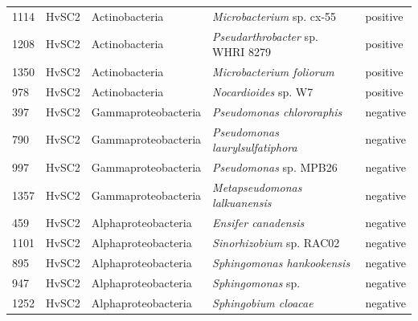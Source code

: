 \begin{longtable}{lllll}
		1114 & HvSC2 & Actinobacteria & \textit{Microbacterium} sp. cx-55 & positive \\
		1208 & HvSC2 & Actinobacteria & \textit{Pseudarthrobacter} sp. WHRI 8279 & positive \\
		1350 & HvSC2 & Actinobacteria & \textit{Microbacterium foliorum} & positive \\
		978 & HvSC2 & Actinobacteria & \textit{Nocardioides} sp. W7 & positive \\
		397 & HvSC2 & Gammaproteobacteria & \textit{Pseudomonas chlororaphis} & negative \\
		790 & HvSC2 & Gammaproteobacteria & \textit{Pseudomonas laurylsulfatiphora} & negative \\
		997 & HvSC2 & Gammaproteobacteria & \textit{Pseudomonas} sp. MPB26 & negative \\
		1357 & HvSC2 & Gammaproteobacteria & \textit{Metapseudomonas lalkuanensis} & negative \\
		459 & HvSC2 & Alphaproteobacteria & \textit{Ensifer canadensis} & negative \\
		1101 & HvSC2 & Alphaproteobacteria & \textit{Sinorhizobium} sp. RAC02 & negative \\
		895 & HvSC2 & Alphaproteobacteria & \textit{Sphingomonas hankookensis} & negative \\
		947 & HvSC2 & Alphaproteobacteria & \textit{Sphingomonas} sp. & negative \\
		1252 & HvSC2 & Alphaproteobacteria & \textit{Sphingobium cloacae} & negative \\
\end{longtable}
	